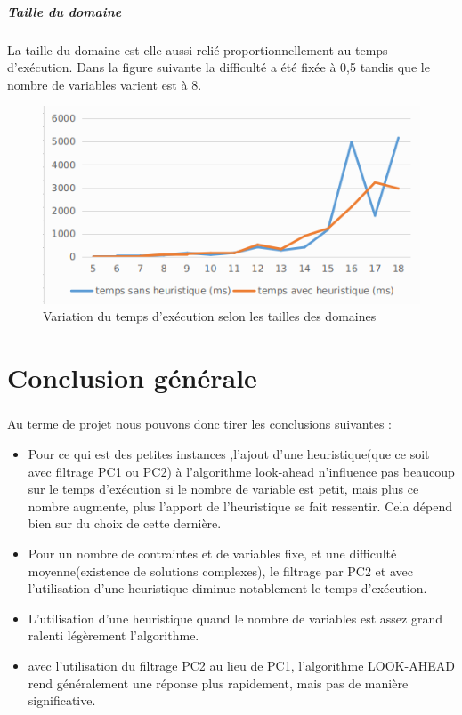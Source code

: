 \documentclass[12pt]{report}
\begin{document}
\paragraph{Taille du domaine}
La taille du domaine est elle aussi relié proportionnellement  au temps d’exécution. Dans la figure suivante la difficulté a été fixée à 0,5 tandis que le nombre de variables varient est à 8.
\begin{figure}[H]
	\centering
	\includegraphics[scale=0.5]{imgs/domain.png}
	\caption{Variation du temps d'exécution selon les tailles des domaines}
	\label{fig:doms}
\end{figure}
\chapter{Conclusion générale}
\paragraph{}
Au terme de projet nous pouvons donc tirer les conclusions suivantes :
\begin{itemize}
	\item Pour ce qui est des petites instances ,l'ajout d'une heuristique(que ce soit avec filtrage PC1 ou PC2) à l'algorithme look-ahead n'influence pas beaucoup sur le temps d'exécution si le nombre de variable est petit, mais plus ce nombre augmente, plus l'apport de l'heuristique se fait ressentir. Cela dépend bien sur du choix de cette dernière.
	
	\item Pour un nombre de contraintes et de variables fixe, et une difficulté moyenne(existence de solutions complexes), le filtrage par PC2 et avec l'utilisation d'une heuristique diminue notablement le temps d'exécution. 
	
	\item L'utilisation d'une heuristique quand le nombre de variables est assez grand ralenti légèrement l'algorithme.
	
	\item avec l'utilisation du filtrage PC2 au lieu de PC1, l'algorithme LOOK-AHEAD rend généralement une réponse plus rapidement, mais pas de manière significative.
\end{itemize} 
\end{document}
